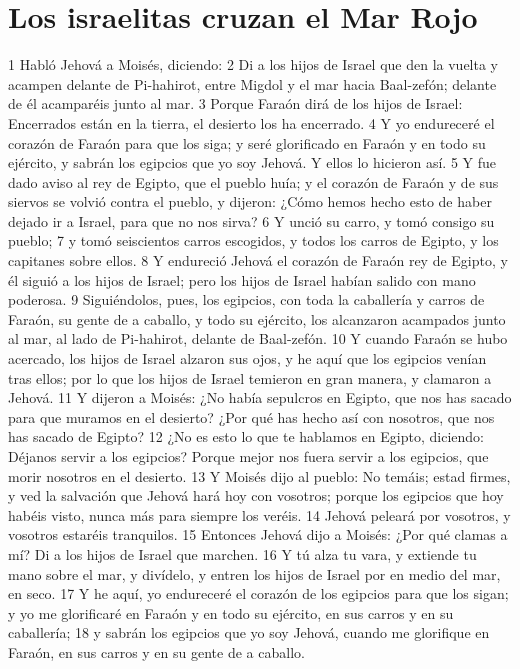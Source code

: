 \section{Los israelitas cruzan el Mar Rojo}
1 Habló Jehová a Moisés, diciendo:
2 Di a los hijos de Israel que den la vuelta y acampen delante de Pi-hahirot, entre Migdol y el mar hacia Baal-zefón; delante de él acamparéis junto al mar.
3 Porque Faraón dirá de los hijos de Israel: Encerrados están en la tierra, el desierto los ha encerrado.
4 Y yo endureceré el corazón de Faraón para que los siga; y seré glorificado en Faraón y en todo su ejército, y sabrán los egipcios que yo soy Jehová. Y ellos lo hicieron así.
5 Y fue dado aviso al rey de Egipto, que el pueblo huía; y el corazón de Faraón y de sus siervos se volvió contra el pueblo, y dijeron: ¿Cómo hemos hecho esto de haber dejado ir a Israel, para que no nos sirva?
6 Y unció su carro, y tomó consigo su pueblo;
7 y tomó seiscientos carros escogidos, y todos los carros de Egipto, y los capitanes sobre ellos.
8 Y endureció Jehová el corazón de Faraón rey de Egipto, y él siguió a los hijos de Israel; pero los hijos de Israel habían salido con mano poderosa.
9 Siguiéndolos, pues, los egipcios, con toda la caballería y carros de Faraón, su gente de a caballo, y todo su ejército, los alcanzaron acampados junto al mar, al lado de Pi-hahirot, delante de Baal-zefón.
10 Y cuando Faraón se hubo acercado, los hijos de Israel alzaron sus ojos, y he aquí que los egipcios venían tras ellos; por lo que los hijos de Israel temieron en gran manera, y clamaron a Jehová.
11 Y dijeron a Moisés: ¿No había sepulcros en Egipto, que nos has sacado para que muramos en el desierto? ¿Por qué has hecho así con nosotros, que nos has sacado de Egipto?
12 ¿No es esto lo que te hablamos en Egipto, diciendo: Déjanos servir a los egipcios? Porque mejor nos fuera servir a los egipcios, que morir nosotros en el desierto.
13 Y Moisés dijo al pueblo: No temáis; estad firmes, y ved la salvación que Jehová hará hoy con vosotros; porque los egipcios que hoy habéis visto, nunca más para siempre los veréis.
14 Jehová peleará por vosotros, y vosotros estaréis tranquilos.
15 Entonces Jehová dijo a Moisés: ¿Por qué clamas a mí? Di a los hijos de Israel que marchen.
16 Y tú alza tu vara, y extiende tu mano sobre el mar, y divídelo, y entren los hijos de Israel por en medio del mar, en seco.
17 Y he aquí, yo endureceré el corazón de los egipcios para que los sigan; y yo me glorificaré en Faraón y en todo su ejército, en sus carros y en su caballería;
18 y sabrán los egipcios que yo soy Jehová, cuando me glorifique en Faraón, en sus carros y en su gente de a caballo.

